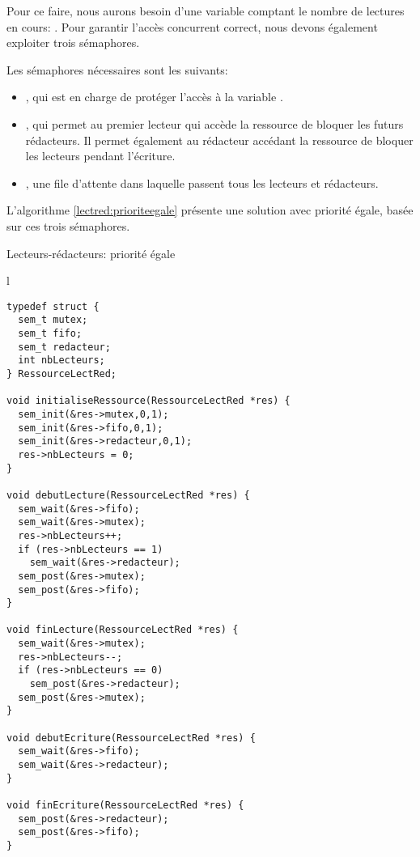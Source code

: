 Pour ce faire, nous aurons besoin d'une variable comptant le nombre de lectures en cours: . Pour garantir l'accès concurrent correct, nous devons également exploiter trois sémaphores.

Les sémaphores nécessaires sont les suivants:
\begin{itemize}
\item {}, qui est en charge de protéger l'accès à la variable .
\item {}, qui permet au premier lecteur qui accède la ressource de bloquer les futurs rédacteurs. Il permet également au rédacteur accédant la ressource de bloquer les lecteurs pendant l'écriture.
\item {}, une file d'attente dans laquelle passent tous les lecteurs et rédacteurs.
\end{itemize}

L'algorithme \ref{lectred:prioriteegale} présente une solution avec priorité égale, basée sur ces trois sémaphores.

\begin{algorithm}[h!tp]
\caption{Lecteurs-rédacteurs: priorité égale}\label{lectred:prioriteegale}
\centering
\begin{tabular}{l}
\lstset{language=C++}
\begin{lstlisting}
typedef struct {
  sem_t mutex;
  sem_t fifo;
  sem_t redacteur;
  int nbLecteurs;
} RessourceLectRed;

void initialiseRessource(RessourceLectRed *res) {
  sem_init(&res->mutex,0,1);
  sem_init(&res->fifo,0,1);
  sem_init(&res->redacteur,0,1);
  res->nbLecteurs = 0;
}

void debutLecture(RessourceLectRed *res) {
  sem_wait(&res->fifo);
  sem_wait(&res->mutex);
  res->nbLecteurs++;
  if (res->nbLecteurs == 1)
    sem_wait(&res->redacteur);
  sem_post(&res->mutex);
  sem_post(&res->fifo);
}

void finLecture(RessourceLectRed *res) {
  sem_wait(&res->mutex);
  res->nbLecteurs--;
  if (res->nbLecteurs == 0)
    sem_post(&res->redacteur);
  sem_post(&res->mutex);
}

void debutEcriture(RessourceLectRed *res) {
  sem_wait(&res->fifo);
  sem_wait(&res->redacteur);
}

void finEcriture(RessourceLectRed *res) {
  sem_post(&res->redacteur);
  sem_post(&res->fifo);
}
\end{lstlisting}
\end{tabular}

\end{algorithm}

